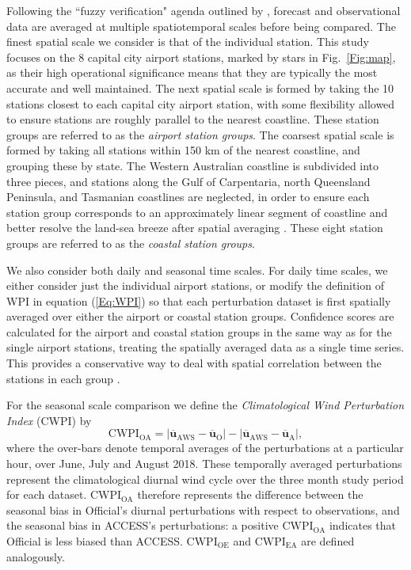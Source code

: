 \documentclass[twocol]{ametsoc}
\begin{document}
Following the ``fuzzy verification" agenda outlined by \citep{ebert08}, forecast and observational data are averaged at multiple spatiotemporal scales before being compared. The finest spatial scale we consider is that of the individual station. This study focuses on the 8 capital city airport stations, marked by stars in Fig.~\ref{Fig:map}, as their high operational significance means that they are typically the most accurate and well maintained. The next spatial scale is formed by taking the 10 stations closest to each capital city airport station, with some flexibility allowed to ensure stations are roughly parallel to the nearest coastline. These station groups are referred to as the \textit{airport station groups}. The coarsest spatial scale is formed by taking all stations within 150 km of the nearest coastline, and grouping these by state. The Western Australian coastline is subdivided into three pieces, and stations along the Gulf of Carpentaria, north Queensland Peninsula, and Tasmanian coastlines are neglected, in order to ensure each station group corresponds to an approximately linear segment of coastline and better resolve the land-sea breeze after spatial averaging \citep[e.g.][]{vincent16}. These eight station groups are referred to as the \textit{coastal station groups}.

We also consider both daily and seasonal time scales. For daily time scales, we either consider just the individual airport stations, or modify the definition of WPI in equation (\ref{Eq:WPI}) so that each perturbation dataset is first spatially averaged over either the airport or coastal station groups. Confidence scores are calculated for the airport and coastal station groups in the same way as for the single airport stations, treating the spatially averaged data as a single time series. This provides a conservative way to deal with spatial correlation between the stations in each group \citep{griffiths17}. 

For the seasonal scale comparison we define the \textit{Climatological Wind Perturbation Index} (CWPI) by
\begin{equation}
\text{CWPI}_{\text{OA}} = \left\lvert \overline{\boldsymbol{u}}_{\text{AWS}}-\overline{\boldsymbol{u}}_{\text{O}} \right\rvert - \left\lvert \overline{\boldsymbol{u}}_{\text{AWS}}-\overline{\boldsymbol{u}}_{\text{A}} \right\rvert,
\end{equation}
where the over-bars denote temporal averages of the perturbations at a particular hour, over June, July and August 2018. These temporally averaged perturbations represent the climatological diurnal wind cycle over the three month study period for each dataset. $\text{CWPI}_{\text{OA}}$ therefore represents the difference between the seasonal bias in Official's diurnal perturbations with respect to observations, and the seasonal bias in ACCESS's perturbations: a positive $\text{CWPI}_{\text{OA}}$ indicates that Official is less biased than ACCESS. $\text{CWPI}_{\text{OE}}$ and $\text{CWPI}_{\text{EA}}$ are defined analogously. 
\end{document}
